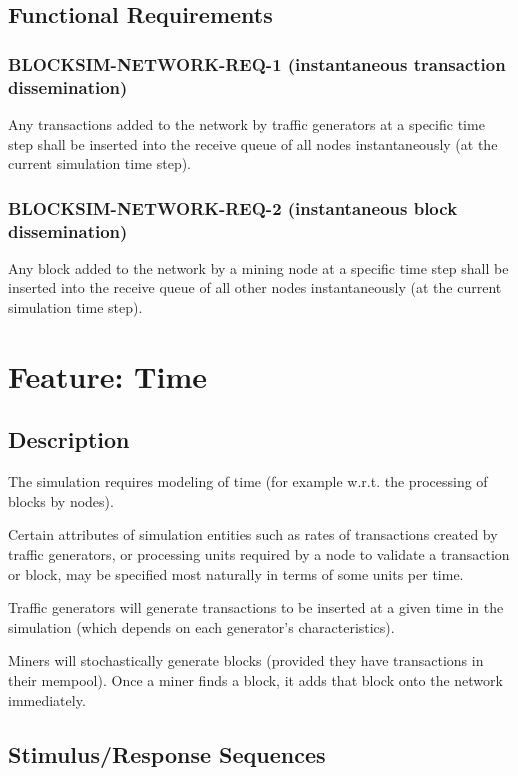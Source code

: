 \documentclass{scrreprt}
\begin{document}
\subsection{Functional Requirements}


\subsubsection{BLOCKSIM-NETWORK-REQ-1 (instantaneous transaction dissemination)}

Any transactions added to the network by traffic generators at a specific time step shall be inserted into the receive
queue of all nodes instantaneously (at the current simulation time step).

\subsubsection{BLOCKSIM-NETWORK-REQ-2 (instantaneous block dissemination)}

Any block added to the network by a mining node at a specific time step shall be inserted into the receive
queue of all other nodes instantaneously (at the current simulation time step).



\section{Feature: Time}

\subsection{Description}

The simulation requires modeling of time (for example w.r.t. the
processing of blocks by nodes).

Certain attributes of simulation entities such as rates of transactions
created by traffic generators, or processing units required by a node
to validate a transaction or block, may be specified most naturally in terms
of some units per time.

Traffic generators will generate transactions to be inserted at a given time
in the simulation (which depends on each generator's characteristics).

Miners will stochastically generate blocks (provided they have transactions
in their mempool). Once a miner finds a block, it adds that block onto
the network immediately.


\subsection{Stimulus/Response Sequences}
\end{document}
